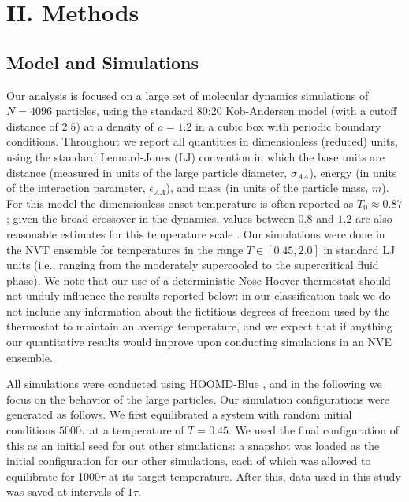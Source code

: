 \documentclass[aps,reprint,superscriptaddress,nofootinbib, notitlepage,prl]{revtex4-2}
\begin{document}
%
%
\section{II. Methods}
%
%
\subsection{Model and Simulations}
Our analysis is focused on a large set of molecular dynamics simulations of $N=4096$ particles, using the standard 80:20 Kob-Andersen model \cite{kob1995testing} (with a cutoff distance of $2.5$) at a density of $\rho=1.2$ in a cubic box with periodic boundary conditions. Throughout we report all quantities in dimensionless (reduced) units, using the standard Lennard-Jones (LJ) convention in which the base units are distance (measured in units of the large particle diameter, $\sigma_{AA}$), energy (in units of the interaction parameter, $\epsilon_{AA}$), and mass (in units of the particle mass, $m$). For this model the dimensionless onset temperature is often reported as $T_0\approx 0.87$ \cite{keys2011excitations,schoenholz2016structural}; given the broad crossover in the dynamics, values between $0.8$ and $1.2$ are also reasonable estimates for this temperature scale \cite{debenedetti2001supercooled,pedersen2018phase}. Our simulations were done in the NVT ensemble for temperatures in the range $T \in [0.45, 2.0]$ in standard LJ units (i.e., ranging from the moderately supercooled to the supercritical fluid phase). We note that our use of a deterministic Nose-Hoover thermostat \cite{frenkel2023understanding} should not unduly influence the results reported below: in our classification task we do not include any information about the fictitious degrees of freedom used by the thermostat to maintain an average temperature, and we expect that if anything our quantitative results would improve upon conducting simulations in an NVE ensemble.

All simulations  were conducted using HOOMD-Blue \cite{anderson2020hoomd}, and in the following we focus on the behavior of the large particles. Our simulation configurations were generated as follows. We first equilibrated a system with random initial conditions $5000\tau$ at a temperature of $T=0.45$. We used the final configuration of this as an initial seed for out other simulations: a snapshot was loaded as the initial configuration for our other simulations, each of which was allowed to equilibrate for 1000$\tau$ at its target temperature. After this, data used in this study was saved at intervals of $1\tau$.
\end{document}
